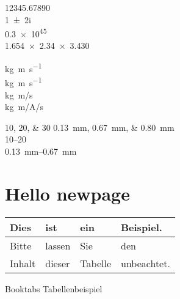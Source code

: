 
\num{12345,67890} \\
\num{1+-2i} \\
\num{.3e45} \\
\num{1.654 x 2.34 x 3.430}

\si{kg.m.s^{-1}} \\
\si{\kilogram\metre\per\second} \\
\si[per-mode=symbol]
{\kilogram\metre\per\second} \\
\si[per-mode=symbol]
{\kilogram\metre\per\ampere\per\second}

\numlist{10;20;30}
\SIlist{0.13;0.67;0.80}{\milli\metre} \\
\numrange{10}{20} \\
\SIrange{0.13}{0.67}{\milli\metre}


\newpage
\section{Hello newpage}

\begin{table}[htb]
\centering
{}
\label{tbl:beispiel}
\begin{tabular}{l|lll}
Dies & ist & ein & Beispiel.\\\hline
Bitte & lassen & Sie & den \\
Inhalt & dieser & Tabelle & unbeachtet.
\end{tabular}
\end{table}

Booktabs Tabellenbeispiel

